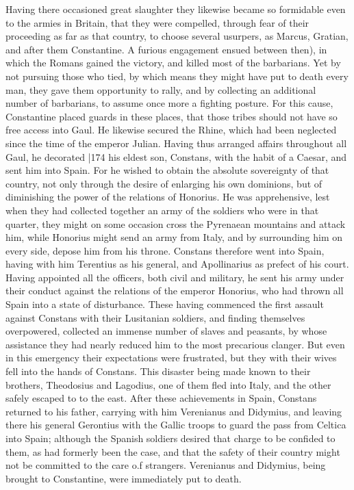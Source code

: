 Having there occasioned great slaughter they likewise became so formidable even to the armies in Britain, that they were compelled, through fear of their proceeding as far as that country, to choose several usurpers, as Marcus, Gratian, and after them Constantine. A furious engagement ensued between then), in which the Romans gained the victory, and killed most of the barbarians. Yet by not pursuing those who tied, by which means they might have put to death every man, they gave them opportunity to rally, and by collecting an additional number of barbarians, to assume once more a fighting posture. For this cause, Constantine placed guards in these places, that those tribes should not have so free access into Gaul. He likewise secured the Rhine,
which had been neglected since the time of the emperor Julian. Having thus arranged affairs throughout all Gaul, he decorated
|174 his eldest son, Constans, with the habit of a Caesar, and sent him into Spain. For he wished to obtain the absolute sovereignty of that country, not only through the desire of enlarging his own dominions, but of diminishing the power of the relations of Honorius. He was apprehensive, lest when they had collected together an army of the soldiers who were in that quarter, they might on some occasion cross the Pyrenaean mountains and attack him, while Honorius might send an army from Italy, and by surrounding him on every side, depose him from his throne. Constans therefore went into Spain, having with him Terentius as his general, and Apollinarius as prefect of his court. Having appointed all the officers, both civil and military, he sent his army under their conduct against the relations of the emperor Honorius, who had thrown all Spain into a state of disturbance. These having commenced the first assault against Constans with their Lusitanian soldiers, and finding themselves overpowered, collected an immense number of slaves and peasants, by whose assistance they had nearly reduced him to the most precarious clanger. But even in this emergency their expectations were frustrated, but they with their wives fell into the hands of Constans. This disaster being made known to their brothers, Theodosius and Lagodius, one of them fled into Italy, and the other safely escaped to to the east. After these achievements in Spain, Constans returned to his father, carrying with him Verenianus and Didymius, and leaving there his general Gerontius with the Gallic troops to guard the pass from Celtica into Spain; although the Spanish soldiers desired that charge to be confided to them, as had formerly been the case, and that the safety of their country might not be committed to the care o.f strangers. Verenianus and Didymius, being brought to Constantine, were immediately put to death.

